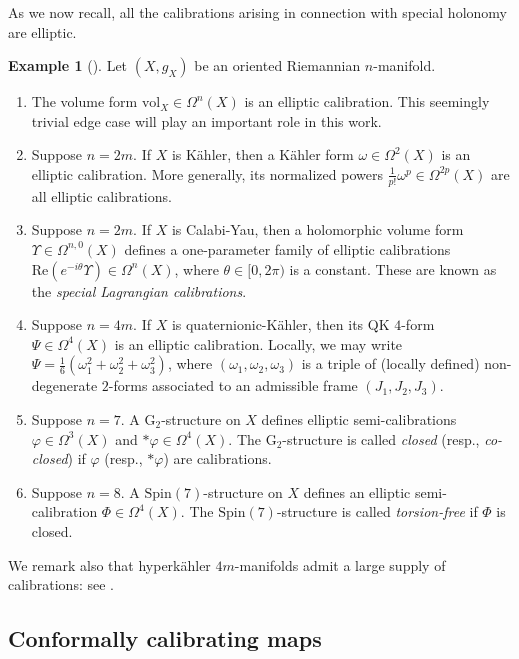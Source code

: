 \documentclass[11pt]{article}
\newcommand{\Spin}{\mathrm{Spin}}
\newcommand{\vol}{\mathrm{vol}}
\theoremstyle{definition}
\newtheorem{example}[thm]{Example}
\numberwithin{equation}{section}
\begin{document}
As we now recall, all the calibrations arising in connection with special holonomy are elliptic.

\begin{example}[\cite{harvey1982calibrated}] Let $(X, g_X)$ be an oriented Riemannian $n$-manifold.
\begin{enumerate}
\item The volume form $\vol_X \in \Omega^n(X)$ is an elliptic calibration.  This seemingly trivial edge case will play an important role in this work.
\item Suppose $n = 2m$.  If $X$ is K\"{a}hler, then a K\"{a}hler form $\omega \in \Omega^2(X)$ is an elliptic calibration.  More generally, its normalized powers $\frac{1}{p!}\omega^p \in \Omega^{2p}(X)$ are all elliptic calibrations.
\item Suppose $n = 2m$.  If $X$ is Calabi-Yau, then a holomorphic volume form $\Upsilon \in \Omega^{n,0}(X)$ defines a one-parameter family of elliptic calibrations $\mathrm{Re}(e^{-i\theta}\Upsilon) \in \Omega^n(X)$, where $\theta \in [0,2\pi)$ is a constant.  These are known as the \emph{special Lagrangian calibrations}.
\item Suppose $n = 4m$.  If $X$ is quaternionic-K\"{a}hler, then its QK $4$-form $\Psi \in \Omega^4(X)$ is an elliptic calibration.  Locally, we may write $\Psi = \frac{1}{6}(\omega_1^2 + \omega_2^2 + \omega_3^2)$, where $(\omega_1, \omega_2, \omega_3)$ is a triple of (locally defined) non-degenerate $2$-forms associated to an admissible frame $(J_1, J_2, J_3)$.
\item Suppose $n = 7$.  A $\mathrm{G}_2$-structure on $X$ defines elliptic semi-calibrations $\varphi \in \Omega^3(X)$ and $\ast \varphi \in \Omega^4(X)$.  The $\mathrm{G}_2$-structure is called \emph{closed} (resp., \emph{co-closed}) if $\varphi$ (resp., $\ast \varphi$) are calibrations.
\item Suppose $n = 8$.  A $\Spin(7)$-structure on $X$ defines an elliptic semi-calibration $\Phi \in \Omega^4(X)$.  The $\Spin(7)$-structure is called \emph{torsion-free} if $\Phi$ is closed.
\end{enumerate}
\end{example}
\noindent We remark also that hyperk\"{a}hler $4m$-manifolds admit a large supply of calibrations: see \cite{bryant1989submanifolds}.


\subsection{Conformally calibrating maps} \label{sec:ConformallyCalibrating}
\end{document}
